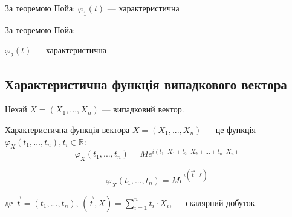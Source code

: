 \begin{example}[$\varphi_1(t) = e^{-|t|}$]
    \beautifulImage
    За теоремою Пойа: $\varphi_1(t)$ --- характеристична
\end{example}

\begin{example}[$\varphi_2(t) = \left\{ \begin{array}{ll}
        1 - |t|, & |t| \leqslant 1 \\
        0, & |t| > 1
    \end{array} \right.$]

    \beautifulImage
    
    За теоремою Пойа: 
    
    $\varphi_2(t)$ --- характеристична
\end{example}


\subsection{Характеристична функція випадкового вектора}

Нехай $X = (X_1, ..., X_n)$ --- випадковий вектор.

\begin{definition}[Характеристична функція вектора $X = (X_1, ..., X_n)$]
    Характеристична функція вектора $X = (X_1, ..., X_n)$ --- це
    функція $\varphi_X(t_1, ..., t_n), t_i \in \mathbb{R}$:
    \begin{equation}
        \varphi_X(t_1, ..., t_n)
        = Me^{i(t_1 \cdot X_1 + t_2 \cdot X_2 + ... + t_n \cdot X_n)}
    \end{equation}

    \begin{equation}
        \varphi_X(t_1, ..., t_n)
        = Me^{i(\Vec{t}, X)}
    \end{equation}
    
    де $\Vec{t} = (t_1, ..., t_n)$,
    $(\Vec{t}, X) = \sum\limits_{i=1}^{n} t_i \cdot X_i$,
    --- скалярний добуток.
\end{definition}

